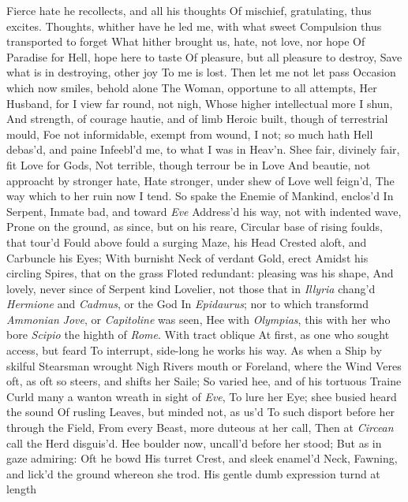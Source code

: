 \documentclass[11pt]{book}
\newcounter {first}
\begin{document}
Fierce hate he recollects, and all his thoughts 
Of mischief, gratulating, thus excites. 
\quad Thoughts, whither have he led me, with what sweet 
Compulsion thus transported to forget 
What hither brought us, hate, not love, nor hope 
Of Paradise for Hell, hope here to taste 
Of pleasure, but all pleasure to destroy, 
Save what is in destroying, other joy 
To me is lost.  Then let me not let pass 
Occasion which now smiles, behold alone 
The Woman, opportune to all attempts, 
Her Husband, for I view far round, not nigh, 
Whose higher intellectual more I shun, 
And strength, of courage hautie, and of limb 
Heroic built, though of terrestrial mould, 
Foe not informidable, exempt from wound, 
I not; so much hath Hell debas'd, and paine 
Infeebl'd me, to what I was in Heav'n. 
Shee fair, divinely fair, fit Love for Gods, 
Not terrible, though terrour be in Love 
And beautie, not approacht by stronger hate, 
Hate stronger, under shew of Love well feign'd, 
The way which to her ruin now I tend. 
\quad So spake the Enemie of Mankind, enclos'd 
In Serpent, Inmate bad, and toward \textit{Eve} 
Address'd his way, not with indented wave, 
Prone on the ground, as since, but on his reare, 
Circular base of rising foulds, that tour'd 
Fould above fould a surging Maze, his Head 
Crested aloft, and Carbuncle his Eyes; 
With burnisht Neck of verdant Gold, erect 
Amidst his circling Spires, that on the grass 
Floted redundant: pleasing was his shape, 
And lovely, never since of Serpent kind 
Lovelier, not those that in \textit{Illyria} chang'd 
\textit{Hermione} and \textit{Cadmus}, or the God 
In \textit{Epidaurus}; nor to which transformd 
\textit{Ammonian} \textit{Jove}, or \textit{Capitoline} was seen, 
Hee with \textit{Olympias}, this with her who bore 
\textit{Scipio} the highth of \textit{Rome}.  With tract oblique 
At first, as one who sought access, but feard 
To interrupt, side-long he works his way. 
As when a Ship by skilful Stearsman wrought 
Nigh Rivers mouth or Foreland, where the Wind 
Veres oft, as oft so steers, and shifts her Saile; 
So varied hee, and of his tortuous Traine 
Curld many a wanton wreath in sight of \textit{Eve}, 
To lure her Eye; shee busied heard the sound 
Of rusling Leaves, but minded not, as us'd 
To such disport before her through the Field, 
From every Beast, more duteous at her call, 
Then at \textit{Circean} call the Herd disguis'd. 
Hee boulder now, uncall'd before her stood; 
But as in gaze admiring: Oft he bowd 
His turret Crest, and sleek enamel'd Neck, 
Fawning, and lick'd the ground whereon she trod. 
His gentle dumb expression turnd at length 
\end{document}
